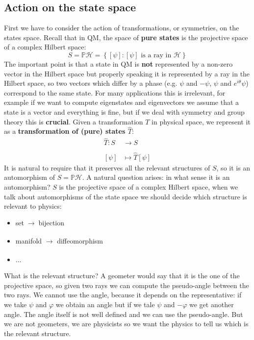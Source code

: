 \documentclass[../main.tex]{subfiles}
\begin{document}
\subsection{Action on the state space}
First we have to consider the action of transformations, or symmetries, on the states space. Recall that in QM, the space of \textbf{pure states} is the projective space of a complex Hilbert space:
\[
S=\mathbb{P}\mathcal{H}=\left\{[\psi]:[\psi] \text{ is a ray in } \mathcal{H}\right\}
\]
The important point is that a state in QM is \textbf{not} represented by a non-zero vector in the Hilbert space but properly speaking it is represented by a ray in the Hilbert space, so two vectors which differ by a phase (e.g. $\psi$ and $-\psi$, $\psi$ and $e^{i\theta}\psi$) correspond to the same state. For many applications this is irrelevant, for example if we want to compute eigenstates and eigenvectors we assume that a state is a vector and everything is fine, but if we deal with symmetry and group theory this is \textbf{crucial}. Given a transformation $T$ in physical space, we represent it as a \textbf{transformation of (pure) states $\hat{T}$}:
\begin{align*}
    \hat{T}:S&\xrightarrow[]{}S\\
    [\psi]&\mapsto\hat{T}[\psi]
\end{align*}
It is natural to require that it preserves all the relevant structures of $S$, so it is an automorphism of $S=\mathbb{P}\mathcal{H}$. A natural question arises: in what sense it is an automorphism? $S$ is the projective space of a complex Hilbert space, when we talk about automorphisms of the state space we should decide which structure is relevant to physics:
\begin{itemize}
    \item set$\;\xrightarrow[]{}\;$bijection
    \item manifold $\xrightarrow[]{}$ diffeomorphism
    \item $\dots$
\end{itemize}
What is the relevant structure? A geometer would say that it is the one of the projective space, so given two rays we can compute the pseudo-angle between the two rays. We cannot use the angle, because it depends on the representative: if we take $\psi$ and $\varphi$ we obtain an angle but if we tale $\psi$ and $-\varphi$ we get another angle. The angle itself is not well defined and we can use the pseudo-angle. But we are not geometers, we are physicists so we want the physics to tell us which is the relevant structure.
\end{document}
